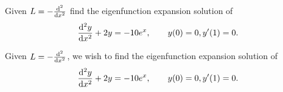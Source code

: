 \documentclass[12pt]{report}
\begin{document}
\newpage



\begin{problem}
    Given $L = -\frac{\mathrm{d}^{2} }{\mathrm{d} x^{2}}$ find the eigenfunction expansion solution of 
    \[ 
        \frac{\mathrm{d}^{2} y}{\mathrm{d} x^{2}} + 2y = -10 e^{x}, ~~~~~~ y(0) = 0, y'(1) = 0.
    \]
\end{problem}

\begin{solution}

    \noindent
    Given $L = -\frac{\mathrm{d}^{2} }{\mathrm{d} x^{2}}$, we wish to find the eigenfunction expansion solution of 
    \begin{equation}\label{p2}
        \frac{\mathrm{d}^{2} y}{\mathrm{d} x^{2}} + 2y = -10 e^{x}, ~~~~~~ y(0) = 0, y'(1) = 0.
    \end{equation} 


\end{solution}
\end{document}
